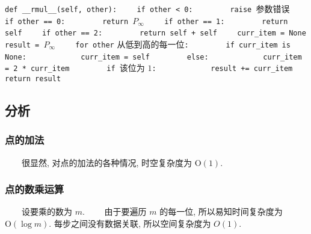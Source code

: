 \documentclass[12pt,a4paper]{article}
\begin{document}
\lstinline{def __rmul__(self, other):}
\newline
\lstinline{    if other < 0:}
\newline
\lstinline{        raise }参数错误
\newline
\lstinline{    if other == 0:}
\newline
\lstinline{        return }$ P_{\infty} $
\newline
\lstinline{    if other == 1:}
\newline
\lstinline{        return self}
\newline
\lstinline{    if other == 2:}
\newline
\lstinline{        return self + self}
\newline
\lstinline{    curr_item = None}
\newline
\lstinline{    result = }$ P_{\infty} $
\newline
\lstinline{    for other} 从低到高的每一位\lstinline{:}
\newline
\lstinline{        if curr_item is None:}
\newline
\lstinline{            curr_item = self}
\newline
\lstinline{        else:}
\newline
\lstinline{            curr_item = 2 * curr_item}
\newline
\lstinline{        if }该位为 $1$\lstinline{:}
\newline
\lstinline{            result += curr_item}
\newline
\lstinline{    return result}

\subsection*{分析}

\subsubsection*{点的加法}

　　很显然, 对点的加法的各种情况, 时空复杂度为 $ \mathrm{O}(1) $.

\subsubsection*{点的数乘运算}

　　设要乘的数为 $ m $.
\newline
　　由于要遍历 $ m $ 的每一位, 所以易知时间复杂度为 $ \mathrm{O}(\log m) $. 每步之间没有数据关联, 所以空间复杂度为 $ O(1) $.
\end{document}
